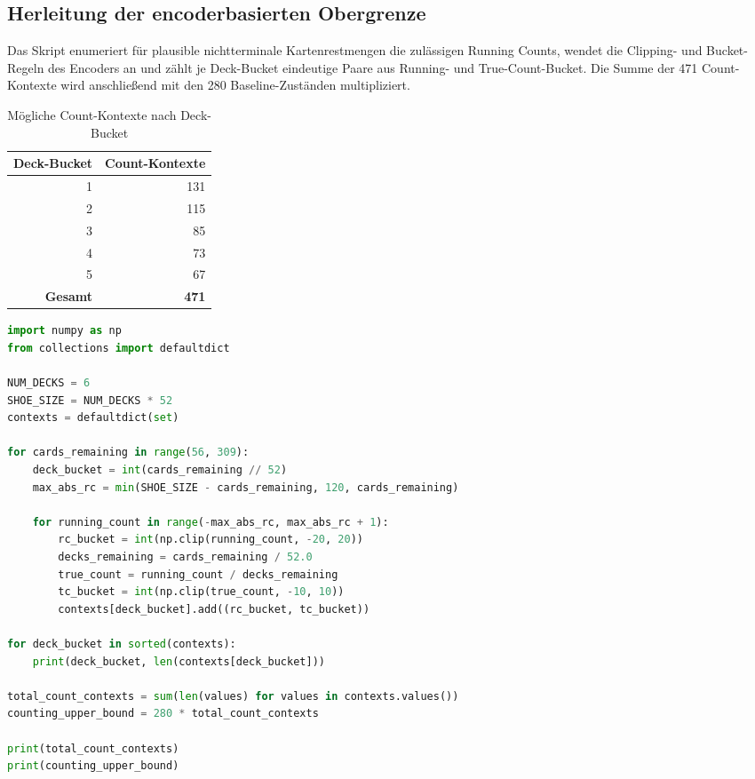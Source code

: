 \subsection{Herleitung der encoderbasierten Obergrenze}
\label{sec:counting_upper_bound}

Das Skript enumeriert für plausible nichtterminale Kartenrestmengen die
zulässigen Running Counts, wendet die Clipping- und Bucket-Regeln des
Encoders an und zählt je Deck-Bucket eindeutige Paare aus Running- und
True-Count-Bucket. Die Summe der 471 Count-Kontexte wird anschließend mit
den 280 Baseline-Zuständen multipliziert.

\begin{table}[H]
  \centering
  \caption{Mögliche Count-Kontexte nach Deck-Bucket}
  \label{tab:count_contexts}
  \small
  \begin{tabular}{rr}
    \toprule
    \textbf{Deck-Bucket} & \textbf{Count-Kontexte}\\
    \midrule
    1 & 131\\
    2 & 115\\
    3 & 85\\
    4 & 73\\
    5 & 67\\
    \midrule
    \textbf{Gesamt} & \textbf{471}\\
    \bottomrule
  \end{tabular}
\end{table}

\clearpage
\begin{lstlisting}[language=Python,caption={Berechnung der encoderbasierten Obergrenze},label={lst:counting_upper_bound}]
import numpy as np
from collections import defaultdict

NUM_DECKS = 6
SHOE_SIZE = NUM_DECKS * 52
contexts = defaultdict(set)

for cards_remaining in range(56, 309):
    deck_bucket = int(cards_remaining // 52)
    max_abs_rc = min(SHOE_SIZE - cards_remaining, 120, cards_remaining)

    for running_count in range(-max_abs_rc, max_abs_rc + 1):
        rc_bucket = int(np.clip(running_count, -20, 20))
        decks_remaining = cards_remaining / 52.0
        true_count = running_count / decks_remaining
        tc_bucket = int(np.clip(true_count, -10, 10))
        contexts[deck_bucket].add((rc_bucket, tc_bucket))

for deck_bucket in sorted(contexts):
    print(deck_bucket, len(contexts[deck_bucket]))

total_count_contexts = sum(len(values) for values in contexts.values())
counting_upper_bound = 280 * total_count_contexts

print(total_count_contexts)
print(counting_upper_bound)
\end{lstlisting}
